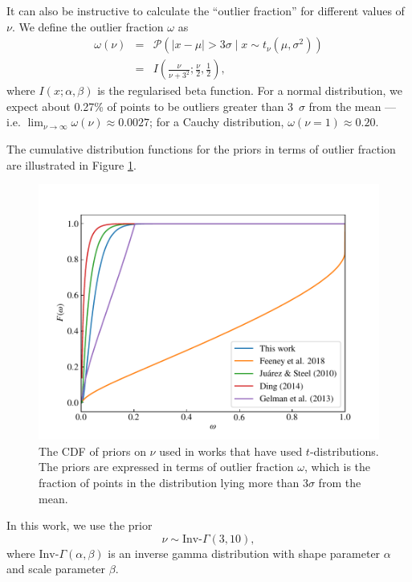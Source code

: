 \documentclass[fleqn,usenatbib]{mnras}
\begin{document}
It can also be instructive to calculate the ``outlier fraction'' for different
values of $\nu$. We define the outlier fraction $\omega$ as
\begin{eqnarray}
    \omega(\nu) &=& \mathcal P\left(|x - \mu| > 3 \sigma \mid x \sim t_\nu (\mu, \sigma^2) \right) \\
    &=& I\left(\frac{\nu}{\nu + 3^2};\frac\nu2, \frac12\right),
\end{eqnarray}
where $I(x; \alpha, \beta)$ is the regularised beta function. For a normal
distribution, we expect about 0.27\% of points to be outliers greater than
3~$\sigma$ from the mean --- i.e. $\lim_{\nu \rightarrow \infty}\omega(\nu)
\approx 0.0027$; for a Cauchy distribution, $\omega(\nu = 1) \approx 0.20$.

The cumulative distribution functions for the priors in terms of outlier
fraction are illustrated in Figure \ref{fig:priors.outlier_frac}.
\begin{figure}
	\includegraphics[width=\columnwidth]{graphics/cdf_outlier_frac}
    \caption{The CDF of priors on $\nu$ used in works that have used
    $t$-distributions. The priors are expressed in terms of outlier fraction
    $\omega$, which is the fraction of points in the distribution lying more
    than 3$\sigma$ from the mean.}
    \label{fig:priors.outlier_frac}
\end{figure}

In this work, we use the prior
\begin{equation}
    \nu \sim \text{Inv-}\Gamma(3, 10),
\end{equation}
where $\text{Inv-}\Gamma(\alpha, \beta)$ is an inverse gamma distribution with
{\color{red} shape parameter $\alpha$ and scale parameter $\beta$}.
\end{document}
